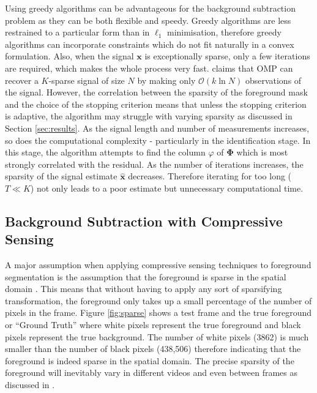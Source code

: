 \documentclass[conference]{IEEEtran}
\begin{document}
Using greedy algorithms can be advantageous for the background subtraction problem as they can be both flexible and speedy. Greedy algorithms are less restrained to a particular form than in $\ell_1$ minimisation, therefore greedy algorithms can incorporate constraints which do not fit naturally in a convex formulation. Also, when the signal $\boldsymbol{x}$ is exceptionally sparse, only a few iterations are required, which makes the whole process very fast. \cite{tropp2007} claims that OMP can recover a $K$-sparse signal of size $N$ by making only $\mathcal{O}(k \ln N)$ observations of the signal. However, the correlation between the sparsity of the foreground mask and the choice of the stopping criterion means that unless the stopping criterion is adaptive, the algorithm may struggle with varying sparsity as discussed in Section \ref{sec:results}. As the signal length and number of measurements increases, so does the computational complexity - particularly in the identification stage. In this stage, the algorithm attempts to find the column $\varphi$ of $\boldsymbol{\Phi}$ which is most strongly correlated with the residual. As the number of iterations increases, the sparsity of the signal estimate $\boldsymbol{\hat{x}}$ decreases. Therefore iterating for too long ($T \ll K$) not only leads to a poor estimate but unnecessary computational time. 

  

\subsection{Background Subtraction with Compressive Sensing}
\label{sec:backgr-subtr-with}

A major assumption when applying compressive sensing techniques to foreground segmentation is the assumption that the foreground is sparse in the spatial domain  \cite{Cevher2008b}. This means that without having to apply any sort of sparsifying transformation, the foreground only takes up a small percentage of the number of pixels in the frame. Figure \ref{fig:sparse} shows a test frame and the true foreground or ``Ground Truth'' where white pixels represent the true foreground and black pixels represent the true background. The number of white pixels (3862) is much smaller than the number of black pixels (438,506) therefore indicating that the foreground is indeed sparse in the spatial domain. The precise sparsity of the foreground will inevitably vary in different  videos and even between frames as discussed in \cite{Warnell2011}. 
\end{document}
